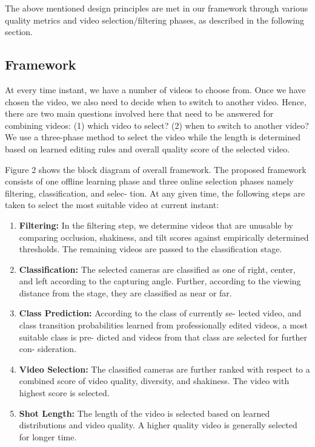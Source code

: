 \documentclass{sig-alternate}
\begin{document}
The above mentioned design principles are met in our framework through various quality metrics and video selection/filtering phases, as described in the following section.

\subsection{Framework}
At every time instant, we have a number of videos to choose
from. Once we have chosen the video, we also need to decide when
to switch to another video. Hence, there are two main questions
involved here that need to be answered for combining videos: (1)
which video to select? (2) when to switch to another video? We
use a three-phase method to select the video while the length is
determined based on learned editing rules and overall quality score
of the selected video.

Figure 2 shows the block diagram of overall framework. The
proposed framework consists of one offline learning phase and three online selection phases namely filtering, classification, and selec-
tion. At any given time, the following steps are taken to select the
most suitable video at current instant:

\begin{enumerate}
    \item \textbf{Filtering:} In the filtering step, we determine videos that are
unusable by comparing occlusion, shakiness, and tilt scores
against empirically determined thresholds. The remaining
videos are passed to the classification stage.
    \item \textbf{Classification: }The selected cameras are classified as one
of right, center, and left according to the capturing angle.
Further, according to the viewing distance from the stage,
they are classified as near or far.
    \item \textbf{Class Prediction: }According to the class of currently se-
lected video, and class transition probabilities learned from
professionally edited videos, a most suitable class is pre-
dicted and videos from that class are selected for further con-
sideration.
    \item \textbf{Video Selection: }The classified cameras are further ranked
with respect to a combined score of video quality, diversity,
and shakiness. The video with highest score is selected.
    \item \textbf{Shot Length: }The length of the video is selected based on
learned distributions and video quality. A higher quality video
is generally selected for longer time.
\end{enumerate}
\end{document}
